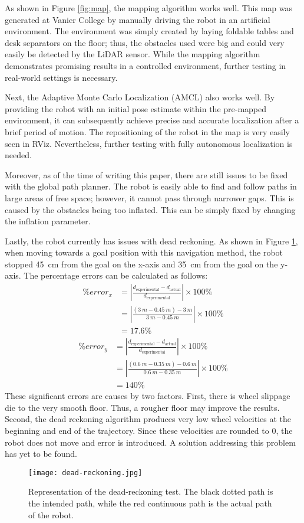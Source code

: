 As shown in Figure \ref{fig:map}, the mapping algorithm works well. This map was generated at Vanier College by manually driving the robot in an artificial environment. The environment was simply created by laying foldable tables and desk separators on the floor; thus, the obstacles used were big and could very easily be detected by the LiDAR sensor. While the mapping algorithm demonstrates promising results in a controlled environment, further testing in real-world settings is necessary.

Next, the Adaptive Monte Carlo Localization (AMCL) also works well. By providing the robot with an initial pose estimate within the pre-mapped environment, it can subsequently achieve precise and accurate localization after a brief period of motion. The repositioning of the robot in the map is very easily seen in RViz. Nevertheless, further testing with fully autonomous localization is needed.

Moreover, as of the time of writing this paper, there are still issues to be fixed with the global path planner. The robot is easily able to find and follow paths in large areas of free space; however, it cannot pass through narrower gaps. This is caused by the obstacles being too inflated. This can be simply fixed by changing the inflation parameter.

Lastly, the robot currently has issues with dead reckoning. As shown in Figure \ref{fig:dead-reckoning}, when moving towards a goal position with this navigation method, the robot stopped \qty{45}{cm} from the goal on the x-axis and \qty{35}{cm} from the goal on the y-axis. The percentage errors can be calculated as follows:
\begin{equation*}
    \begin{split}
        \% error_x & =\left|\frac{d_\text{experimental}-d_\text{actual}}{d_\text{experimental}}\right|\times100\%    \\
                   & =\left|\frac{(\qty{3}{m}-\qty{0.45}{m})-\qty{3}{m}}{\qty{3}{m}-\qty{0.45}{m}}\right|\times100\% \\
                   & =17.6\%
    \end{split}
\end{equation*}
\begin{equation*}
    \begin{split}
        \% error_y & =\left|\frac{d_\text{experimental}-d_\text{actual}}{d_\text{experimental}}\right|\times100\%          \\
                   & =\left|\frac{(\qty{0.6}{m}-\qty{0.35}{m})-\qty{0.6}{m}}{\qty{0.6}{m}-\qty{0.35}{m}}\right|\times100\% \\
                   & =140\%
    \end{split}
\end{equation*}
These significant errors are causes by two factors. First, there is wheel slippage die to the very smooth floor. Thus, a rougher floor may improve the results. Second, the dead reckoning algorithm produces very low wheel velocities at the beginning and end of the trajectory. Since these velocities are rounded to 0, the robot does not move and error is introduced. A solution addressing this problem has yet to be found.

\begin{figure}[!htb]
    \texttt{[image: dead-reckoning.jpg]}
    \centering
    \caption{Representation of the dead-reckoning test. The black dotted path is the intended path, while the red continuous path is the actual path of the robot.}
    \label{fig:dead-reckoning}
\end{figure}